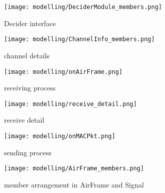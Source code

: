 












\begin{figure}[h]
 \centering
 \texttt{[image: modelling/DeciderModule\_members.png]}
 \caption{Decider interface}
 \label{fig: Decider interface}
\end{figure}

\begin{figure}[h]
 \centering
 \texttt{[image: modelling/ChannelInfo\_members.png]}
 \caption{channel details}
 \label{fig: channel details}
\end{figure}

\begin{figure}[h]
 \centering
 \texttt{[image: modelling/onAirFrame.png]}
 \caption{receiving process}
 \label{fig: receiving process}
\end{figure}

\begin{figure}[h]
 \centering
 \texttt{[image: modelling/receive\_detail.png]}
 \caption{receive detail}
 \label{fig: receive detail}
\end{figure}

\begin{figure}[h]
 \centering
 \texttt{[image: modelling/onMACPkt.png]}
 \caption{sending process}
 \label{fig: sending process}
\end{figure}

\begin{figure}[h]
 \centering
 \texttt{[image: modelling/AirFrame\_members.png]}
 \caption{member arrangement in AirFrame and Signal}
 \label{fig: member AirFrame}
\end{figure}


